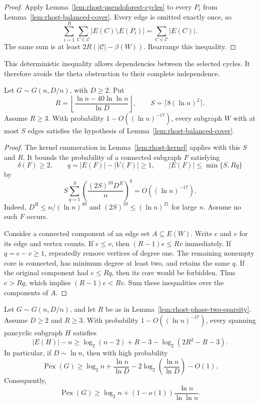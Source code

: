 \begin{proof}
Apply Lemma~\ref{lem:rhost-pseudoforest-cycles} to every $P_i$ from
Lemma~\ref{lem:rhost-balanced-cover}.
Every edge is omitted exactly once, so
\[
 \sum_{i=1}^{R}\sum_{C\in\mathcal C}|E(C)\setminus E(P_i)|
 =\sum_{C\in\mathcal C}|E(C)|.
\]
The same sum is at least $2R(|\mathcal C|-\beta(W))$.
Rearrange this inequality.
\end{proof}

This deterministic inequality allows dependencies between the selected cycles.
It therefore avoids the theta obstruction to their complete independence.

\begin{lemma}
\label{lem:rhost-phase-two-sparsity}
Let $G\sim G(n,D/n)$, with $D\ge2$.
Put
\[
 R=\left\lfloor\frac{\ln n-40\ln\ln n}{\ln D}\right\rfloor,
 \qquad S=\lceil8(\ln n)^2\rceil.
\]
Assume $R\ge3$.
With probability $1-O((\ln n)^{-17})$, every subgraph $W$ with at most $S$ edges
satisfies the hypothesis of Lemma~\ref{lem:rhost-balanced-cover}.
\end{lemma}

\begin{proof}
The kernel enumeration in Lemma~\ref{lem:rhost-kernel} applies with this $S$ and $R$.
It bounds the probability of a connected subgraph $F$ satisfying
\[
 \delta(F)\ge2,\qquad q=|E(F)|-|V(F)|\ge1,
 \qquad |E(F)|\le\min\{S,Rq\}
\]
by
\[
 S\sum_{q=1}^{S}
 \left(\frac{(2S)^{10}D^R}{n}\right)^q
 =O((\ln n)^{-17}).
\]
Indeed, $D^R\le n/(\ln n)^{40}$ and $(2S)^{10}\le(\ln n)^{21}$ for large $n$.
Assume no such $F$ occurs.

Consider a connected component of an edge set $A\subseteq E(W)$.
Write $e$ and $v$ for its edge and vertex counts.
If $e\le v$, then $(R-1)e\le Rv$ immediately.
If $q=e-v\ge1$, repeatedly remove vertices of degree one.
The remaining nonempty core is connected, has minimum degree at least two, and retains the same $q$.
If the original component had $e\le Rq$, then its core would be forbidden.
Thus $e>Rq$, which implies $(R-1)e<Rv$.
Sum these inequalities over the components of $A$.
\end{proof}

\begin{theorem}
\label{thm:rhost-coefficient-one}
Let $G\sim G(n,D/n)$, and let $R$ be as in Lemma~\ref{lem:rhost-phase-two-sparsity}.
Assume $D\ge2$ and $R\ge3$.
With probability $1-O((\ln n)^{-17})$, every spanning pancyclic subgraph $H$ satisfies
\[
 \boxed{\quad
 |E(H)|-n
 \ge\log_2(n-2)+R-3-\log_2(2R^2-R-3).
 \quad}
\]
In particular, if $D\sim\ln n$, then with high probability
\[
 \operatorname{Pex}(G)
 \ge\log_2 n+
 \frac{\ln n}{\ln D}
 -2\log_2\!\left(\frac{\ln n}{\ln D}\right)-O(1).
\]
Consequently,
\[
 \operatorname{Pex}(G)
 \ge\log_2 n+(1-o(1))\frac{\ln n}{\ln\ln n}.
\]
\end{theorem}

